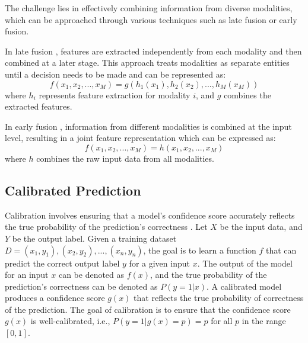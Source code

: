 The challenge lies in effectively combining information from diverse modalities, which can be approached through various techniques such as late fusion or early fusion. %

In late fusion \cite{trong2020late}, features are extracted independently from each modality and then combined at a later stage. This approach treats modalities as separate entities until a decision needs to be made and can be represented as:
\begin{equation}
f(x_1, x_2, ..., x_M) = g(h_1(x_1), h_2(x_2), ..., h_M(x_M))
\end{equation}
where \(h_i\) represents feature extraction for modality \(i\), and \(g\) combines the extracted features.

In early fusion \cite{nguyen2021gefa}, information from different modalities is combined at the input level, resulting in a joint feature representation which can be expressed as:
\begin{equation}
f(x_1, x_2, ..., x_M) = h(x_1, x_2, ..., x_M)
\end{equation}
where \(h\) combines the raw input data from all modalities.


\subsection*{Calibrated Prediction}
\label{sec:Calibration}
Calibration involves ensuring that a model's confidence score accurately reflects the true probability of the prediction's correctness \cite{ovadia2019can}. Let $X$ be the input data, and $Y$ be the output label. Given a training dataset $D = {(x_1, y_1), (x_2, y_2),..., (x_n, y_n)}$, the goal is to learn a function $f$ that can predict the correct output label $y$ for a given input $x$. The output of the model for an input $x$ can be denoted as $f(x)$, and the true probability of the prediction's correctness can be denoted as $P(y=1|x)$. A calibrated model produces a confidence score $g(x)$ that reflects the true probability of correctness of the prediction. The goal of calibration is to ensure that the confidence score $g(x)$ is well-calibrated, i.e., $P(y=1|g(x)=p) = p$ for all $p$ in the range $[0, 1]$.

